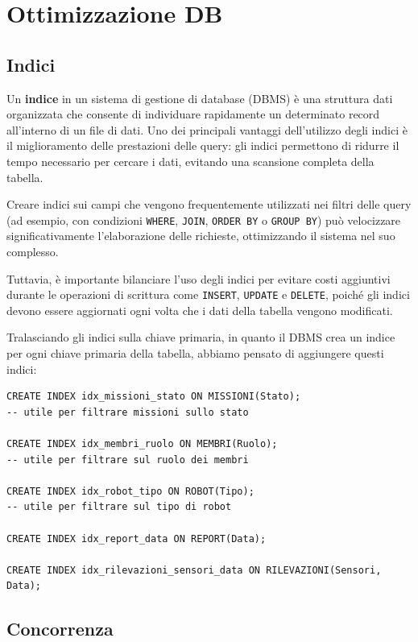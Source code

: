 \section{Ottimizzazione DB}

\subsection{Indici}

Un \textbf{indice} in un sistema di gestione di database (DBMS) è una struttura dati organizzata che consente di individuare rapidamente un determinato record all'interno di un file di dati. Uno dei principali vantaggi dell'utilizzo degli indici è il miglioramento delle prestazioni delle query: gli indici permettono di ridurre il tempo necessario per cercare i dati, evitando una scansione completa della tabella.

Creare indici sui campi che vengono frequentemente utilizzati nei filtri delle query (ad esempio, con condizioni \texttt{WHERE}, \texttt{JOIN}, \texttt{ORDER BY} o \texttt{GROUP BY}) può velocizzare significativamente l'elaborazione delle richieste, ottimizzando il sistema nel suo complesso.

Tuttavia, è importante bilanciare l'uso degli indici per evitare costi aggiuntivi durante le operazioni di scrittura come \texttt{INSERT}, \texttt{UPDATE} e \texttt{DELETE}, poiché gli indici devono essere aggiornati ogni volta che i dati della tabella vengono modificati.

Tralasciando gli indici sulla chiave primaria, in quanto il DBMS crea un indice per ogni chiave primaria della tabella, abbiamo pensato di aggiungere questi indici: \\

\begin{lstlisting}
CREATE INDEX idx_missioni_stato ON MISSIONI(Stato); 
-- utile per filtrare missioni sullo stato

CREATE INDEX idx_membri_ruolo ON MEMBRI(Ruolo); 
-- utile per filtrare sul ruolo dei membri

CREATE INDEX idx_robot_tipo ON ROBOT(Tipo); 
-- utile per filtrare sul tipo di robot

CREATE INDEX idx_report_data ON REPORT(Data);

CREATE INDEX idx_rilevazioni_sensori_data ON RILEVAZIONI(Sensori, Data);
\end{lstlisting}

\subsection{Concorrenza}

